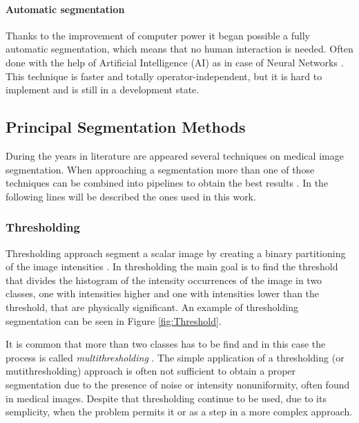 \documentclass{standalone}
\begin{document}
\paragraph{Automatic segmentation}
Thanks to the improvement of computer power it began possible a fully automatic segmentation, which means that no human interaction is needed. Often done with the help of Artificial Intelligence (AI) as in case of Neural Networks \cite{ART:Biondini}.
This technique is faster and totally operator-independent, but it is hard to implement\cite{mastersthesis:Filitto} and is still in a development state.

\subsection{Principal Segmentation Methods}

During the years in literature are appeared several techniques on medical image segmentation. When approaching a segmentation more than one of those techniques can be combined into pipelines to obtain the best results \cite{ART:Pham}.
In the following lines will be described the ones used in this work.

\subsubsection{Thresholding}
Thresholding approach segment a scalar image by creating a binary partitioning of the image intensities \cite{ART:Pham}.
In thresholding the main goal is to find the threshold that divides the histogram of the intensity occurrences of the image in two classes, one with intensities higher and one with intensities lower than the threshold, that are physically significant. An example of thresholding segmentation can be seen in Figure \ref{fig:Threshold}.

It is common that more than two classes has to be find and in this case the process is called \textit{multithresholding} \cite{ART:Pham}.
The simple application of a thresholding (or mutithresholding) approach is often not sufficient to obtain a proper segmentation due to the presence of noise or intensity nonuniformity, often found in medical images. Despite that thresholding continue to be used, due to its semplicity, when the problem permits it or as a step in a more complex approach\cite{ART:Withey}.
\end{document}
